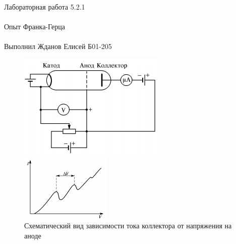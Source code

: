 \documentclass{astroedu-lab}
\begin{document}
\begin{problem}{\huge Лабораторная работа 5.2.1\\\\Опыт Франка-Герца\\\\Выполнил Жданов Елисей Б01-205}
\begin{figure}[h]
\begin{center}
\begin{minipage}[h]{0.45\linewidth}
\includegraphics[width=1\linewidth]{fig1.PNG}
\caption{Схема опыта Франка и Герца} %
\label{ris:experimoriginal} %
\end{minipage}
\hfill 
\begin{minipage}[h]{0.45\linewidth}
\includegraphics[width=1\linewidth]{fig2.PNG}
\caption{Схематический вид зависимости тока коллектора от напряжения на аноде}
\label{ris:experimcoded}
\end{minipage}
\end{center}
\end{figure}


\end{problem}
\end{document}

